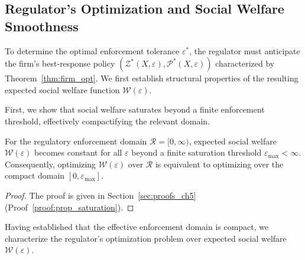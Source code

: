 \subsection{Regulator's Optimization and Social Welfare Smoothness}

To determine the optimal enforcement tolerance $\varepsilon^*$, the regulator must anticipate the firm's best-response policy $(\mathcal{Z}^*(X, \varepsilon), \mathcal{P}^*(X, \varepsilon))$ characterized by Theorem~\ref{thm:firm_opt}. We first establish structural properties of the resulting expected social welfare function $\mathcal{W}(\varepsilon)$.

First, we show that social welfare saturates beyond a finite enforcement threshold, effectively compactifying the relevant domain.

\begin{proposition}
\label{prop:saturation}
For the regulatory enforcement domain $\mathcal{R} = [0, \infty)$, expected social welfare $\mathcal{W}(\varepsilon)$ becomes constant for all $\varepsilon$ beyond a finite saturation threshold $\varepsilon_{\max} < \infty$. Consequently, optimizing $\mathcal{W}(\varepsilon)$ over $\mathcal{R}$ is equivalent to optimizing over the compact domain $[0, \varepsilon_{\max}]$.
\end{proposition}
\begin{proof}
The proof is given in Section~\ref{sec:proofs_ch5} (Proof~\ref{proof:prop_saturation}).
\end{proof}

Having established that the effective enforcement domain is compact, we characterize the regulator's optimization problem over expected social welfare $\mathcal{W}(\varepsilon)$.


